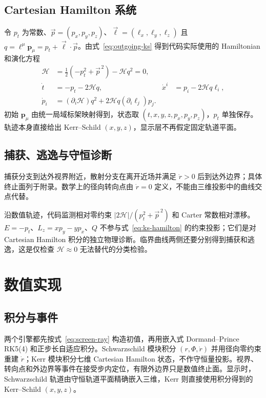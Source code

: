 \documentclass[UTF8,11pt,a4paper,fontset=fandol]{ctexart}
\newcommand{\Ham}{\mathcal H}
\begin{document}
\subsection{Cartesian Hamilton 系统}

令 \(p_t\) 为常数、\(\vec{p}=(p_x,p_y,p_z)\)、\(\vec{\ell}=(\ell_x,\ell_y,\ell_z)\) 且 \(q=\bm{\ell}^\mu\bm{p}_\mu=p_t+\vec{\ell}\cdot\vec{p}\)。由式~\eqref{eq:outgoing-ks} 得到代码实际使用的 Hamiltonian 和演化方程
\begin{align}
 \Ham&=\frac12(-p_t^2+\vec{p}^{\,2})-\mathcal{H} q^2=0,\nonumber\\
 \dot t&=-p_t-2\mathcal{H} q,
 &\dot x^i&=p_i-2\mathcal{H} q\ell_i,\nonumber\\
 \dot p_i&=(\partial_i\mathcal{H})q^2
 +2\mathcal{H} q(\partial_i\ell_j)p_j. \label{eq:ks-hamilton}
\end{align}
初始 \(\bm{p}_\mu\) 由统一局域标架映射得到，状态取 \((t,x,y,z,p_x,p_y,p_z)\)，\(p_t\) 单独保存。轨迹本身直接给出 Kerr--Schild \((x,y,z)\)，显示层不再假定固定轨道平面。

\subsection{捕获、逃逸与守恒诊断}

捕获分支到达外视界附近，散射分支在离开近场并满足 \(\dot r>0\) 后到达外边界；具体终止面列于附录。数学上的径向转向点由 \(\dot r=0\) 定义，不能由三维投影中的曲线交点代替。

沿数值轨迹，代码监测相对零约束 \(|2\Ham|/(p_t^2+\vec{p}^{\,2})\) 和 Carter 常数相对漂移。\(E=-p_t\)、\(L_z=xp_y-yp_x\)、\(Q\) 不参与式~\eqref{eq:ks-hamilton} 的约束投影；它们是对 Cartesian Hamilton 积分的独立物理诊断。临界曲线两侧还要分别得到捕获和逃逸，这是仅检查 \(\Ham\approx0\) 无法替代的分类检验。

\section{数值实现}

\subsection{积分与事件}

两个引擎都先按式~\eqref{eq:screen-ray} 构造初值，再用嵌入式 Dormand--Prince RK5(4) 和正步长自适应积分\cite{DormandPrince1980}。Schwarzschild 模块积分 \((r,\Phi,\dot r)\) 并用径向零约束重建 \(\dot r\)；Kerr 模块积分七维 Cartesian Hamilton 状态，不作守恒量投影。视界、转向点和外边界等事件在接受步内定位，有限外边界只是数值终止面。显示时，Schwarzschild 轨道由守恒轨道平面精确嵌入三维，Kerr 则直接使用积分得到的 Kerr--Schild \((x,y,z)\)。
\end{document}
